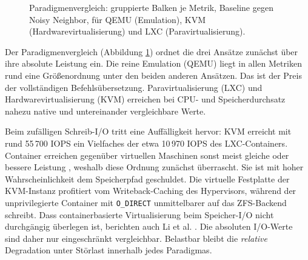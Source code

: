 \documentclass[conference]{IEEEtran}
\newcommand{\metricplot}[6]{%
\begin{axis}[
    title={#1},
    ybar, bar width=12pt,
    width=7.6cm, height=5.0cm,
    enlarge x limits=0.3,
    ylabel={#2}, ymin=0, ymax=#5,
    symbolic x coords={QEMU, KVM, LXC},
    xtick=data,
    nodes near coords,
    every node near coord/.append style={font=\scriptsize, rotate=90, anchor=west,
        /pgf/number format/fixed, /pgf/number format/precision=#6},
    x tick label style={font=\small},
    title style={font=\small\bfseries},
]
\addplot[fill=blue!55, draw=blue!55!black] table [x=Virtualisierung, y=#3] {\paradigmsdata};
\addplot[fill=orange!70, draw=orange!70!black] table [x=Virtualisierung, y=#4] {\paradigmsdata};
\end{axis}}
\begin{document}
\begin{figure}[t]
  \centering
  \caption{Paradigmenvergleich: gruppierte Balken je Metrik, Baseline gegen Noisy Neighbor, für QEMU (Emulation), KVM (Hardwarevirtualisierung) und LXC (Paravirtualisierung).}
  \label{fig:paradigms}
\end{figure}

Der Paradigmenvergleich (Abbildung \ref{fig:paradigms}) ordnet die drei Ansätze zunächst über ihre absolute Leistung ein. Die reine Emulation (QEMU) liegt in allen Metriken rund eine Größenordnung unter den beiden anderen Ansätzen. Das ist der Preis der vollständigen Befehlsübersetzung. Paravirtualisierung (LXC) und Hardwarevirtualisierung (KVM) erreichen bei CPU- und Speicherdurchsatz nahezu native und untereinander vergleichbare Werte.

Beim zufälligen Schreib-I/O tritt eine Auffälligkeit hervor: KVM erreicht mit rund 55\,700 IOPS ein Vielfaches der etwa 10\,970 IOPS des LXC-Containers. Container erreichen gegenüber virtuellen Maschinen sonst meist gleiche oder bessere Leistung \cite{felter2015updated}, weshalb diese Ordnung zunächst überrascht. Sie ist mit hoher Wahrscheinlichkeit dem Speicherpfad geschuldet. Die virtuelle Festplatte der KVM-Instanz profitiert vom Writeback-Caching des Hypervisors, während der unprivilegierte Container mit \texttt{O\_DIRECT} unmittelbarer auf das ZFS-Backend schreibt. Dass containerbasierte Virtualisierung beim Speicher-I/O nicht durchgängig überlegen ist, berichten auch Li et al. \cite{li2017performance}. Die absoluten I/O-Werte sind daher nur eingeschränkt vergleichbar. Belastbar bleibt die \emph{relative} Degradation unter Störlast innerhalb jedes Paradigmas.
\end{document}
